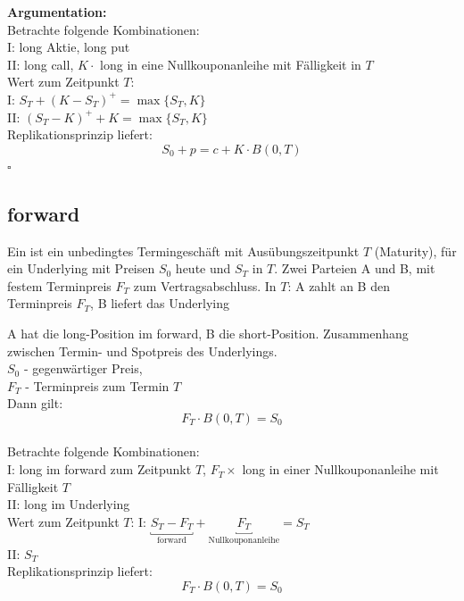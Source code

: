 \textbf{Argumentation:} \\
Betrachte folgende Kombinationen:\\
I: long Aktie, long put\\
II: long call, $K \cdot $ long in eine Nullkouponanleihe mit Fälligkeit in $T$\\

Wert zum Zeitpunkt $T$: \\
I: $S_T + (K-S_T)^+ = \max\{S_T,K\}$ \\
II: $(S_T - K)^+ + K = \max\{S_T,K\}$ \\

Replikationsprinzip liefert:
\[
S_0 + p = c + K \cdot B(0,T)
\]
\hfill $\square$


\subsection{forward} %
\label{sub:forward}

Ein  ist ein unbedingtes Termingeschäft mit Ausübungszeitpunkt $T$ (Maturity), für ein Underlying mit Preisen $S_0$ heute und $S_T$ in $T$. 
Zwei Parteien A und B, mit festem Terminpreis $F_T$ zum Vertragsabschluss. 
In $T$: A zahlt an B den Terminpreis $F_T$, B liefert das Underlying

A hat die long-Position im forward, B die short-Position. Zusammenhang zwischen Termin- und Spotpreis des Underlyings.\\
\hspace{2cm} $S_0$ - gegenwärtiger Preis, \\
\hspace{2cm} $F_T$ - Terminpreis zum Termin $T$\\
Dann gilt:
\[ 
F_T \cdot B(0,T) = S_0
\]
\\
Betrachte folgende Kombinationen:\\
I: long im forward zum Zeitpunkt $T$, $F_T \times$ long in einer Nullkouponanleihe mit Fälligkeit $T$\\
II: long im Underlying\\
Wert zum Zeitpunkt $T$:
I: $\underbracket{S_T - F_T}_{\text{forward}} + \underbracket{F_T}_{\text{Nullkouponanleihe}} = S_T$\\
II: $S_T$\\
Replikationsprinzip liefert:
\[
F_T \cdot B(0,T) = S_0 
\]

